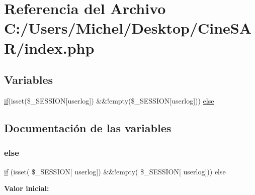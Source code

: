 \hypertarget{index_8php}{}\section{Referencia del Archivo C\+:/\+Users/\+Michel/\+Desktop/\+Cine\+S\+A\+R/index.php}
\label{index_8php}
\subsection*{Variables}
\begin{DoxyCompactItemize}
\item 
\mbox{\hyperlink{register_8php_aefb5893336d7ead40ae915367f4b82cc}{if}}(isset(\$\+\_\+\+S\+E\+S\+S\+I\+ON\mbox{[}\textquotesingle{}userlog\textquotesingle{}\mbox{]}) \&\&!empty(\$\+\_\+\+S\+E\+S\+S\+I\+ON\mbox{[}\textquotesingle{}userlog\textquotesingle{}\mbox{]})) \mbox{\hyperlink{index_8php_a3e85a20b0f9c4bed1d7e6bf901f6030c}{else}}
\end{DoxyCompactItemize}


\subsection{Documentación de las variables}
\mbox{\label{index_8php_a3e85a20b0f9c4bed1d7e6bf901f6030c}} 
\subsubsection{\texorpdfstring{else}{else}}
{\footnotesize\ttfamily \mbox{\hyperlink{register_8php_aefb5893336d7ead40ae915367f4b82cc}{if}} (isset( \$\+\_\+\+S\+E\+S\+S\+I\+ON\mbox{[} \textquotesingle{}userlog\textquotesingle{}\mbox{]}) \&\&!empty( \$\+\_\+\+S\+E\+S\+S\+I\+ON\mbox{[} \textquotesingle{}userlog\textquotesingle{}\mbox{]})) else}

{\bfseries Valor inicial\+:}
\begin{DoxyCode}{0}
\DoxyCodeLine{\{}

\end{DoxyCode}
